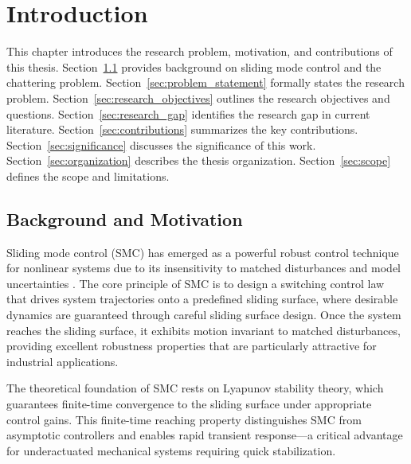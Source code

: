 
\chapter{Introduction}
\label{chap:introduction}

This chapter introduces the research problem, motivation, and contributions of this thesis. Section~\ref{sec:background} provides background on sliding mode control and the chattering problem. Section~\ref{sec:problem_statement} formally states the research problem. Section~\ref{sec:research_objectives} outlines the research objectives and questions. Section~\ref{sec:research_gap} identifies the research gap in current literature. Section~\ref{sec:contributions} summarizes the key contributions. Section~\ref{sec:significance} discusses the significance of this work. Section~\ref{sec:organization} describes the thesis organization. Section~\ref{sec:scope} defines the scope and limitations.

\section{Background and Motivation}
\label{sec:background}

Sliding mode control (SMC) has emerged as a powerful robust control technique for nonlinear systems due to its insensitivity to matched disturbances and model uncertainties \cite{utkin1992sliding, edwards1998sliding}. The core principle of SMC is to design a switching control law that drives system trajectories onto a predefined sliding surface, where desirable dynamics are guaranteed through careful sliding surface design. Once the system reaches the sliding surface, it exhibits motion invariant to matched disturbances, providing excellent robustness properties that are particularly attractive for industrial applications.

The theoretical foundation of SMC rests on Lyapunov stability theory, which guarantees finite-time convergence to the sliding surface under appropriate control gains. This finite-time reaching property distinguishes SMC from asymptotic controllers and enables rapid transient response—a critical advantage for underactuated mechanical systems requiring quick stabilization.

